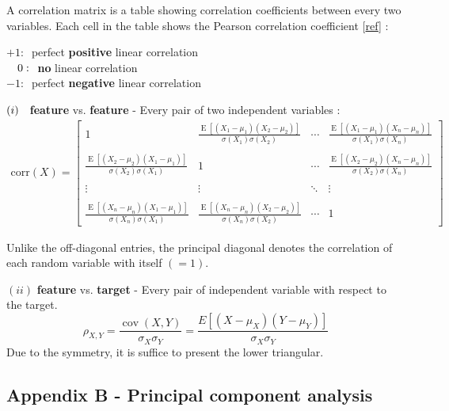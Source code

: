 \documentclass[12pt]{article}
\numberwithin{equation}{section}
\begin{document}
\begin{flushleft}
A correlation matrix is a table showing correlation coefficients between every two variables. Each cell in the table shows the Pearson correlation coefficient [\href{https://en.wikipedia.org/wiki/Pearson_correlation_coefficient}{ref}] :

$+1 :\ $ perfect \textbf{positive} linear correlation \\
$\hspace{3.5mm} 0 :\ $ \textbf{no} linear correlation \\
$ -1 :\ $ perfect \textbf{negative} linear correlation

$(i) \hspace{2mm} $ \textbf{feature} vs. \textbf{feature} - Every pair of two independent variables :
\begin{align*}  
\text{corr}(X) = \begin{bmatrix}
1 & \frac{\operatorname{E}[(X_1 - \mu_1)(X_2 - \mu_2)]}{\sigma(X_1)\sigma(X_2)} & \cdots & \frac{\operatorname{E}[(X_1 - \mu_1)(X_n - \mu_n)]}{\sigma(X_1)\sigma(X_n)} \\ \\
 \frac{\operatorname{E}[(X_2 - \mu_2)(X_1 - \mu_1)]}{\sigma(X_2)\sigma(X_1)} & 1 & \cdots & \frac{\operatorname{E}[(X_2 - \mu_2)(X_n - \mu_n)]}{\sigma(X_2)\sigma(X_n)} \\ \\
 \vdots & \vdots & \ddots & \vdots \\ \\
 \frac{\operatorname{E}[(X_n - \mu_n)(X_1 - \mu_1)]}{\sigma(X_n)\sigma(X_1)} & \frac{\operatorname{E}[(X_n - \mu_n)(X_2 - \mu_2)]}{\sigma(X_n)\sigma(X_2)} & \cdots & 1
\end{bmatrix}
\end{align*}

Unlike the off-diagonal entries, the principal diagonal denotes the correlation of each random variable with itself $(= 1)$.

$(ii)$ \textbf{feature} vs. \textbf{target} - Every pair of independent variable with respect to the target.
$$ \rho_{X,Y} = \frac{\operatorname{cov}(X,Y)}{\sigma_X \sigma_Y} = \frac{E[(X-\mu_X)(Y-\mu_Y)]}{\sigma_X\sigma_Y} $$
Due to the symmetry, it is suffice to present the lower triangular.

\subsection*{\hypertarget{PCA}{Appendix B} - Principal component analysis}


\end{flushleft}
\end{document}
